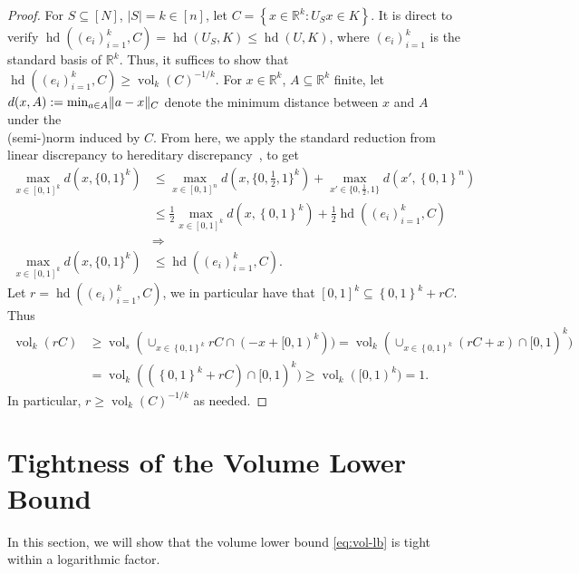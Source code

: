 \documentclass[11pt]{article}
\newtheorem{theorem}{Theorem}
\newcommand{\R}{{\mathbb{R}}}
\newcommand{\set}[1]{\left\{ #1 \right\}}
\DeclareMathOperator{\vollb}{volLB}
\DeclareMathOperator{\hd}{hd}
\DeclareMathOperator{\vol}{vol}
\DeclarePairedDelimiter\norm{\lVert}{\rVert}
\newcommand{\notename}[2]{{\textcolor{red}{{\bf (#1:} {#2}{\bf ) }}}}
\newcommand{\notename}[2]{{\textcolor{red}{\footnotesize{\bf (#1:} {#2}{\bf ) }}}}
\newcommand{\dnote}[1]{{\notename{Daniel}{#1}}}
\newcommand{\notename}[2]{{}}
\newcommand{\dnote}[1]{}
\begin{document}
\vollbstat*
\begin{proof}
For $S \subseteq [N]$, $|S| = k \in [n]$, let $C = \set{x \in \R^k: U_S x \in
K}$. It is direct to verify $\hd((e_i)_{i=1}^k,C) = \hd(U_S,K) \leq \hd(U,K)$,
where $(e_i)_{i=1}^k$ is the standard basis of $\R^k$. Thus, it suffices to
show that $\hd((e_i)_{i=1}^k,C) \geq \vol_k(C)^{-1/k}$. For $x \in \R^k$, $A
\subseteq \R^k$ finite, let $d(x,A) := \min_{a \in A} \norm{a-x}_C$
denote the minimum distance between $x$ and $A$ under the \\ (semi-)norm induced by
$C$. From here, we apply the standard reduction from linear discrepancy to
hereditary discrepancy~\cite{LSV}, to get
\begin{align*}
\max_{x \in [0,1]^k} d(x,\{0,1\}^k) &\leq \max_{x \in [0,1]^n}
d(x,\{0,\tfrac12,1\}^k) + \max_{x' \in \{0,\tfrac12,1\}} d(x',\set{0,1}^n) \\
&\leq \frac{1}{2} \max_{x \in [0,1]^k} d(x,\set{0,1}^k) + \frac{1}{2}
\hd((e_i)_{i=1}^k,C) \\
&\Rightarrow \\
\max_{x \in [0,1]^k} d(x,\{0,1\}^k) &\leq \hd((e_i)_{i=1}^k,C).
\end{align*}
Let $r = \hd((e_i)_{i=1}^k,C)$, we in particular have that $[0,1]^k \subseteq
\set{0,1}^k + rC$. Thus
\begin{align*}
\vol_k(rC) &\geq \vol_s(\cup_{x \in \set{0,1}^k} rC \cap (-x+[0,1)^k)) 
             = \vol_k(\cup_{x \in \set{0,1}^k} (rC+x) \cap [0,1)^k) \\
             &= \vol_k((\set{0,1}^k+rC) \cap [0,1)^k) 
              \geq \vol_k([0,1)^k) = 1 .
\end{align*}
In particular, $r \geq \vol_k(C)^{-1/k}$ as needed.
\end{proof}

\section{Tightness of the Volume Lower Bound}
\label{sec:tightness}

In this section, we will show that the volume lower bound \eqref{eq:vol-lb} is
tight within a logarithmic factor. 

\tightvollb*
\end{document}
